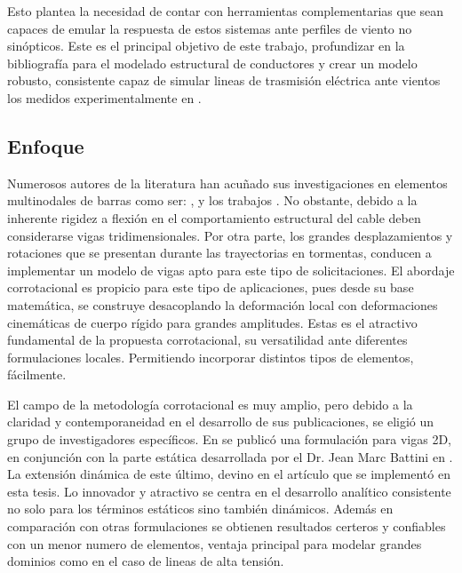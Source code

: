 Esto plantea la necesidad de contar con herramientas complementarias que sean capaces de emular la respuesta de estos sistemas ante perfiles de viento no sinópticos. Este es el principal objetivo de este trabajo, profundizar en la bibliografía para el modelado estructural de conductores y crear un modelo robusto, consistente capaz de simular lineas de trasmisión eléctrica ante vientos los medidos experimentalmente en \cite{stengel2017measurements}. 
  

\subsection{Enfoque}

Numerosos autores de la literatura han acuñado sus investigaciones en elementos multinodales de barras como ser: \cite{desai1995finite}, \cite{yan2009numerical} y los trabajos \cite{gani2010dynamic} \cite{yang2016nonlinear}. No obstante, debido a la inherente rigidez a flexión en el comportamiento estructural del cable deben considerarse vigas tridimensionales. Por otra parte, los grandes desplazamientos y rotaciones que se presentan durante las trayectorias en tormentas, conducen a implementar un modelo de vigas apto para este tipo de solicitaciones. El abordaje corrotacional es propicio para este tipo de aplicaciones, pues desde su base matemática, se construye desacoplando la deformación local con deformaciones cinemáticas de cuerpo rígido para grandes amplitudes. Estas es el atractivo fundamental de la propuesta corrotacional, su versatilidad ante diferentes formulaciones locales. Permitiendo incorporar distintos tipos de elementos, fácilmente.

El campo de la metodología corrotacional es muy amplio, pero debido a la claridad y contemporaneidad en el desarrollo de sus publicaciones, se eligió un grupo de investigadores específicos. En \citep{Le2011} se publicó una formulación para vigas 2D, en conjunción con la parte estática desarrollada por el Dr. Jean Marc Battini  en \citep{Battini2002}. La extensión dinámica de este último, devino en el artículo \citep{Le2014} que se implementó en esta tesis. Lo innovador y atractivo se centra en el desarrollo analítico consistente no solo para los términos estáticos sino también dinámicos. Además en comparación con otras formulaciones se obtienen resultados certeros y confiables con un menor numero de elementos, ventaja principal para modelar grandes dominios como en el caso de lineas de alta tensión.  

